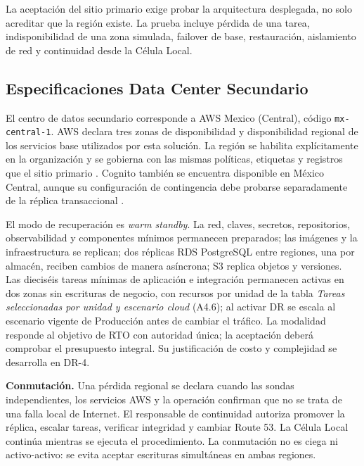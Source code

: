 La aceptación del sitio primario exige probar la arquitectura desplegada, no solo acreditar que la región existe. La prueba incluye pérdida de una tarea, indisponibilidad de una zona simulada, failover de base, restauración, aislamiento de red y continuidad desde la Célula Local.

\subsection{Especificaciones Data Center Secundario}

El centro de datos secundario corresponde a AWS Mexico (Central), código \texttt{mx-central-1}. AWS declara tres zonas de disponibilidad y disponibilidad regional de los servicios base utilizados por esta solución. La región se habilita explícitamente en la organización y se gobierna con las mismas políticas, etiquetas y registros que el sitio primario \parencites{aws-regiones}{aws-rds-regiones}. Cognito también se encuentra disponible en México Central, aunque su configuración de contingencia debe probarse separadamente de la réplica transaccional \parencite{aws-cognito-mexico}.

El modo de recuperación es \emph{warm standby}. La red, claves, secretos, repositorios, observabilidad y componentes mínimos permanecen preparados; las imágenes y la infraestructura se replican; dos réplicas RDS PostgreSQL entre regiones, una por almacén, reciben cambios de manera asíncrona; S3 replica objetos y versiones. Las dieciséis tareas mínimas de aplicación e integración permanecen activas en dos zonas sin escrituras de negocio, con recursos por unidad de la tabla \emph{Tareas seleccionadas por unidad y escenario cloud} (A4.6); al activar DR se escala al escenario vigente de Producción antes de cambiar el tráfico. La modalidad responde al objetivo de RTO con autoridad única; la aceptación deberá comprobar el presupuesto integral. Su justificación de costo y complejidad se desarrolla en DR-4.



\textbf{Conmutación.} Una pérdida regional se declara cuando las sondas independientes, los servicios AWS y la operación confirman que no se trata de una falla local de Internet. El responsable de continuidad autoriza promover la réplica, escalar tareas, verificar integridad y cambiar Route 53. La Célula Local continúa mientras se ejecuta el procedimiento. La conmutación no es ciega ni activo-activo: se evita aceptar escrituras simultáneas en ambas regiones.

